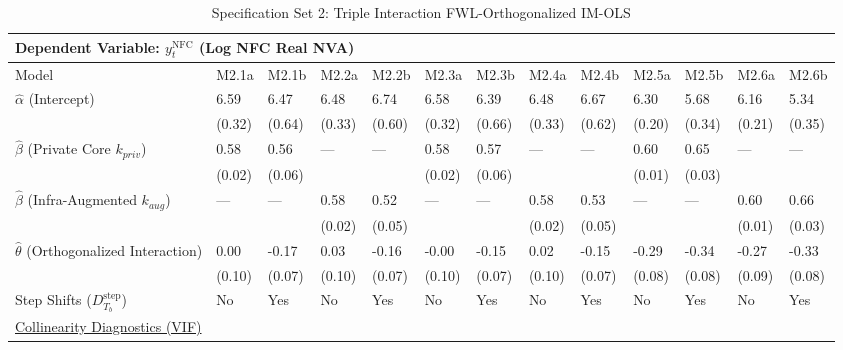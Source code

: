 \begin{table}[H]
\centering
\caption{Specification Set 2: Triple Interaction FWL-Orthogonalized IM-OLS}
\label{tab:spec_set_2}
\scriptsize
\begin{tabular}{p{3.8cm}p{1.5cm}p{1.5cm}p{1.5cm}p{1.5cm}p{1.5cm}p{1.5cm}p{1.5cm}p{1.5cm}p{1.5cm}p{1.5cm}p{1.5cm}p{1.5cm}}
\toprule
\multicolumn{13}{l}{\textbf{Dependent Variable: $y_t^{\text{NFC}}$ (Log NFC Real NVA)}} \\
\midrule
Model & M2.1a & M2.1b & M2.2a & M2.2b & M2.3a & M2.3b & M2.4a & M2.4b & M2.5a & M2.5b & M2.6a & M2.6b  \\
\midrule
$\hat{\alpha}$ (Intercept)  & 6.59 & 6.47 & 6.48 & 6.74 & 6.58 & 6.39 & 6.48 & 6.67 & 6.30 & 5.68 & 6.16 & 5.34  \\
 & {\scriptsize (0.32)} & {\scriptsize (0.64)} & {\scriptsize (0.33)} & {\scriptsize (0.60)} & {\scriptsize (0.32)} & {\scriptsize (0.66)} & {\scriptsize (0.33)} & {\scriptsize (0.62)} & {\scriptsize (0.20)} & {\scriptsize (0.34)} & {\scriptsize (0.21)} & {\scriptsize (0.35)}  \\
$\hat{\beta}$ (Private Core $k_{priv}$)  & 0.58 & 0.56 & --- & --- & 0.58 & 0.57 & --- & --- & 0.60 & 0.65 & --- & ---  \\
 & {\scriptsize (0.02)} & {\scriptsize (0.06)} &  &  & {\scriptsize (0.02)} & {\scriptsize (0.06)} &  &  & {\scriptsize (0.01)} & {\scriptsize (0.03)} &  &   \\
$\hat{\beta}$ (Infra-Augmented $k_{aug}$)  & --- & --- & 0.58 & 0.52 & --- & --- & 0.58 & 0.53 & --- & --- & 0.60 & 0.66  \\
 &  &  & {\scriptsize (0.02)} & {\scriptsize (0.05)} &  &  & {\scriptsize (0.02)} & {\scriptsize (0.05)} &  &  & {\scriptsize (0.01)} & {\scriptsize (0.03)}  \\
$\hat{\theta}$ (Orthogonalized Interaction)  & 0.00 & -0.17 & 0.03 & -0.16 & -0.00 & -0.15 & 0.02 & -0.15 & -0.29 & -0.34 & -0.27 & -0.33  \\
 & {\scriptsize (0.10)} & {\scriptsize (0.07)} & {\scriptsize (0.10)} & {\scriptsize (0.07)} & {\scriptsize (0.10)} & {\scriptsize (0.07)} & {\scriptsize (0.10)} & {\scriptsize (0.07)} & {\scriptsize (0.08)} & {\scriptsize (0.08)} & {\scriptsize (0.09)} & {\scriptsize (0.08)}  \\
Step Shifts ($D^{\text{step}}_{T_b}$)  & No & Yes & No & Yes & No & Yes & No & Yes & No & Yes & No & Yes  \\
\midrule
\multicolumn{13}{l}{\underline{Collinearity Diagnostics (VIF)}} \\

\end{tabular}
\end{table}
